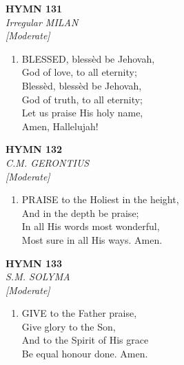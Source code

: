 \newpage
\begin{center}
    {\Large \textbf{HYMN 131}}
    \\
    \textit{Irregular MILAN}
    \\
    \textit{\small [Moderate]}
\end{center}
\vspace{1em}

\begin{enumerate}
    \item BLESSED, bless\`ed be Jehovah, \\
        God of love, to all eternity; \\
        Bless\`ed, bless\`ed be Jehovah, \\
        God of truth, to all eternity; \\
        Let us praise His holy name, \\
        Amen, Hallelujah!

\end{enumerate}

\newpage
\begin{center}
    {\Large \textbf{HYMN 132}}
    \\
    \textit{C.M. GERONTIUS}
    \\
    \textit{\small [Moderate]}
\end{center}
\vspace{1em}

\begin{enumerate}
    \item PRAISE to the Holiest in the height, \\
        And in the depth be praise; \\
        In all His words most wonderful, \\
        Most sure in all His ways. Amen.

\end{enumerate}

\newpage
\begin{center}
    {\Large \textbf{HYMN 133}}
    \\
    \textit{S.M. SOLYMA}
    \\
    \textit{\small [Moderate]}
\end{center}
\vspace{1em}

\begin{enumerate}
    \item GIVE to the Father praise, \\
        Give glory to the Son, \\
        And to the Spirit of His grace \\
        Be equal honour done. Amen.

\end{enumerate}

